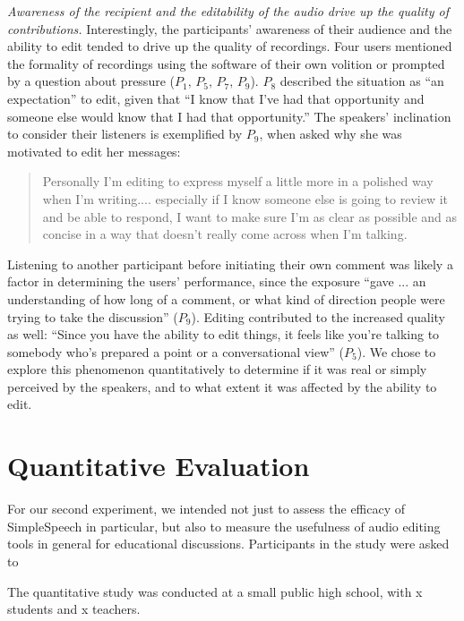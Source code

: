 \emph{Awareness of the recipient and the editability of the audio drive up the quality of contributions.}
Interestingly, the participants' awareness of their audience and the ability to edit tended to drive up the quality of recordings.
Four users mentioned the formality of recordings using the software of their own volition or prompted by a question about pressure ($P_1,\,P_5,\,P_7,\,P_9$). 
$P_8$ described the situation as ``an expectation'' to edit, given that ``I know that I've had that opportunity and someone else would know that I had that opportunity.'' 
The speakers' inclination to consider their listeners is exemplified by $P_9$, when asked why she was motivated to edit her messages:
\begin{quote}
	Personally I'm editing to express myself a little more in a polished way when I'm writing.... especially if I know someone else is going to review it and be able to respond, I want to make sure I'm as clear as possible and as concise in a way that doesn’t really come across when I'm talking.
\end{quote}
Listening to another participant before initiating their own comment was likely a factor in determining the users' performance, since the exposure ``gave ... an understanding of how long of a comment, or what kind of direction people were trying to take the discussion'' ($P_9$). 
Editing contributed to the increased quality as well: ``Since you have the ability to edit things, it feels like you're talking to somebody who's prepared a point or a conversational view'' ($P_5$). 
We chose to explore this phenomenon quantitatively to determine if it was real or simply perceived by the speakers, and to what extent it was affected by the ability to edit.

\section{Quantitative Evaluation}
For our second experiment, we intended not just to assess the efficacy of SimpleSpeech in particular, but also to measure the usefulness of audio editing tools in general for educational discussions.
Participants in the study were asked to 

The quantitative study was conducted at a small public high school, with x students and x teachers.
